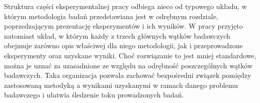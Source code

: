 Struktura części eksperymentalnej pracy odbiega nieco od typowego układu, w którym metodologia badań przedstawiana jest w odrębnym rozdziale, poprzedzającym prezentację eksperymentów i ich wyników. W pracy przyjęto natomiast układ, w którym każdy z trzech głównych wątków badawczych obejmuje zarówno opis właściwej dla niego metodologii, jak i przeprowadzone eksperymenty oraz uzyskane wyniki. Choć rozwiązanie to jest mniej standardowe, można je uznać za uzasadnione ze względu na odrębność poszczególnych wątków badawczych. Taka organizacja pozwala zachować bezpośredni związek pomiędzy zastosowaną metodyką a wynikami uzyskanymi w ramach danego problemu badawczego i ułatwia śledzenie toku prowadzonych badań.
